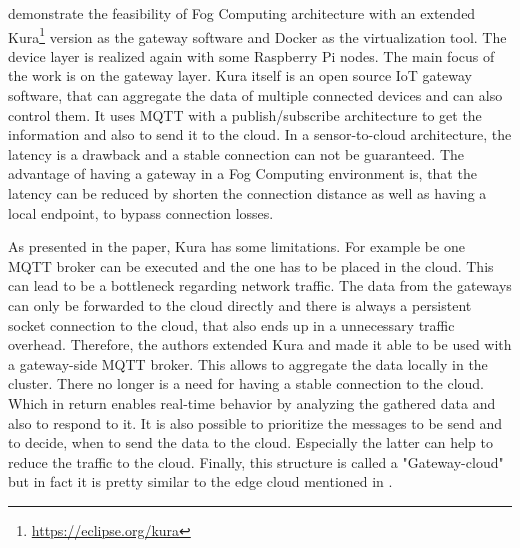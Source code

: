 \autocite{Bellavista:2017} demonstrate the feasibility of Fog Computing architecture with an extended Kura\footnote{\url{https://eclipse.org/kura}} version as the gateway software and Docker as the virtualization tool.
The device layer is realized again with some Raspberry Pi nodes.
The main focus of the work is on the gateway layer.
Kura itself is an open source \ac{IoT} gateway software, that can aggregate the data of multiple connected devices and can also control them.\autocite[cf.][p. 2]{Bellavista:2017}
It uses \ac{MQTT} with a publish/subscribe architecture to get the information and also to send it to the cloud.\autocite[cf.][p. 2]{Bellavista:2017}
In a sensor-to-cloud architecture, the latency is a drawback and a stable connection can not be guaranteed.\autocite[cf.][p. 1]{Bellavista:2017}
The advantage of having a gateway in a Fog Computing environment is, that the latency can be reduced by shorten the connection distance as well as having a local endpoint, to bypass connection losses.\autocite[cf.][p. 1]{Bellavista:2017}

As presented in the paper, Kura has some limitations.
For example be one \ac{MQTT} broker can be executed and the one has to be placed in the cloud.\autocite[cf.][p. 3]{Bellavista:2017}
This can lead to be a bottleneck regarding network traffic.
The data from the gateways can only be forwarded to the cloud directly and there is always a persistent socket connection to the cloud, that also ends up in a unnecessary traffic overhead.\autocite[cf.][p. 3]{Bellavista:2017}
Therefore, the authors extended Kura and made it able to be used with a gateway-side \ac{MQTT} broker.
This allows to aggregate the data locally in the cluster.\autocite[cf.][p. 3]{Bellavista:2017}
There no longer is a need for having a stable connection to the cloud.
Which in return enables real-time behavior by analyzing the gathered data and also to respond to it.\autocite[cf.][p. 3]{Bellavista:2017}
It is also possible to prioritize the messages to be send and to decide, when to send the data to the cloud.\autocite[cf.][p. 3]{Bellavista:2017}
Especially the latter can help to reduce the traffic to the cloud.
Finally, this structure is called a "Gateway-cloud" but in fact it is pretty similar to the edge cloud mentioned in \autocite{Pahl:2016}.

